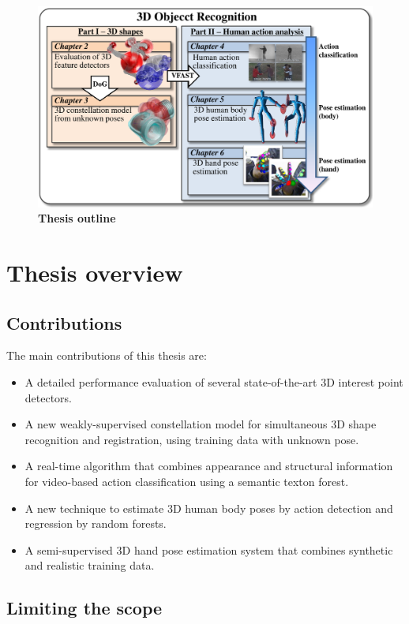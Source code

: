 \begin{figure}[ht]
\centering
\includegraphics[width=1\linewidth]{./fig/intro/intro.pdf}
\caption{\textbf{Thesis outline}} 
\label{fig/intro/outline}
\end{figure}

\section{Thesis overview}

\subsection{Contributions}

The main contributions of this thesis are:
\begin{itemize}
	\item A detailed performance evaluation of several state-of-the-art 3D interest point detectors.
	\item A new weakly-supervised constellation model for simultaneous 3D shape recognition and registration, using training data with unknown pose. 
	\item A real-time algorithm that combines appearance and structural information for video-based action classification using a semantic texton forest. 
	\item A new technique to estimate 3D human body poses by action detection and regression by random forests. 
	\item A semi-supervised 3D hand pose estimation system that combines synthetic and realistic training data. 
\end{itemize}

\subsection{Limiting the scope}

